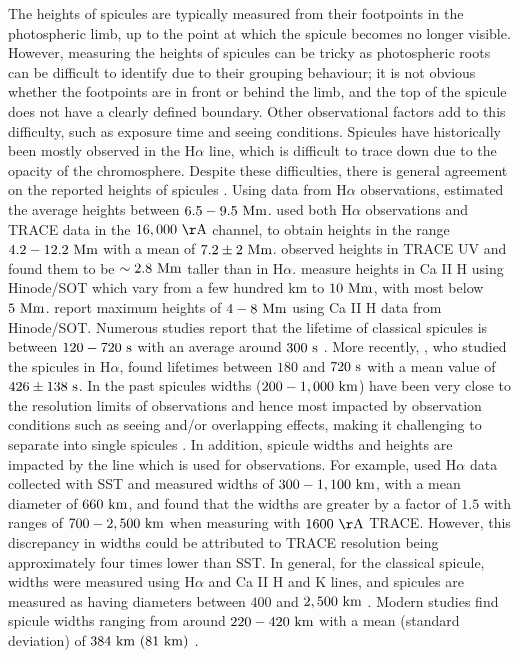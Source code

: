 %
The heights of spicules are typically measured from their footpoints in the photospheric limb, up to the point at which the spicule becomes no longer visible. However, measuring the heights of spicules can be tricky as photospheric roots can be difficult to identify due to their grouping behaviour; it is not obvious whether the footpoints are in front or behind the limb, and the top of the spicule does not have a clearly defined boundary. Other observational factors add to this difficulty, such as exposure time and seeing conditions. Spicules have historically been mostly observed in the H$\alpha$ line, which is difficult to trace down due to the opacity of the chromosphere. Despite these difficulties, there is general agreement on the reported heights of spicules \citep{Tsiropoula2012}. Using data from H$\alpha$ observations, \cite{Beckers1968, Beckers1972ARA&A} estimated the average heights between $6.5-9.5~\rm{Mm}$. \cite{Pasachoff2009SoPh26059P} used both H$\alpha$ observations and TRACE data in the $16,000~\rm{ \AA}$ channel, to obtain heights in the range $4.2-12.2~\rm{Mm}$ with a mean of $7.2\pm2~\rm{Mm}$. \cite{Pasachoff2009SoPh26059P} observed heights in TRACE UV and found them to be $\sim 2.8~\rm{Mm}$ taller than in H$\alpha$. \cite{Pontieu2007PASJ} measure heights in Ca II H using Hinode/SOT which vary from a few hundred km to $10~\rm{Mm}$, with most below $5~\rm{Mm}$. \cite{Pereira2012} report maximum heights of $4-8~\rm{Mm}$ using Ca II H data from Hinode/SOT. Numerous studies report that the lifetime of classical spicules is between $120-720~\rm{s}$ with an average around $300~\rm{s}$ \citep{Roberts1945ApJ,Rush1954AuJPh7230R, Lippincott1957SCoA215L, Alissandrakis1971SoPh2047A, Cook1984AdSpR459C, Georgakilas1999AA341610G}. More recently, \cite{Pasachoff2009SoPh26059P}, who studied the spicules in H$\alpha$, found lifetimes between $180$ and $720~\rm{s}$ with a mean value of $426\pm138~\rm{s}$.
% 
In the past spicules widths ($200-1,000~\rm{km}$) have been very close to the resolution limits of observations and hence most impacted by observation conditions such as seeing and/or overlapping effects, making it challenging to separate into single spicules \citep{Pontieu2007ASPC, Tsiropoula2012}. In addition, spicule widths and heights are impacted by the line which is used for observations. For example, \cite{Pasachoff2009SoPh26059P} used H$\alpha$ data collected with SST and measured widths of $300-1,100~\rm{km}$, with a mean diameter of $660~\rm{km}$, and found that the widths are greater by a factor of $1.5$ with ranges of $700-2,500~\rm{km}$ when measuring with $1600~\rm{\AA}$ TRACE. However, this discrepancy in widths could be attributed to TRACE resolution being approximately four times lower than SST. In general, for the classical spicule, widths were measured using H$\alpha$ and Ca II H and K lines, and spicules are measured as having diameters between $400$ and $2,500~\rm{km}$ \citep{Dunn1960Obs8031D, Beckers1968, Beckers1972ARA&A, Lynch1973SoPh3063L}. Modern studies find spicule widths ranging from around $220-420~\rm{km}$ with a mean (standard deviation) of $384~\rm{km}~(81~\rm{km})$ \cite{Pereira2012}. \np
